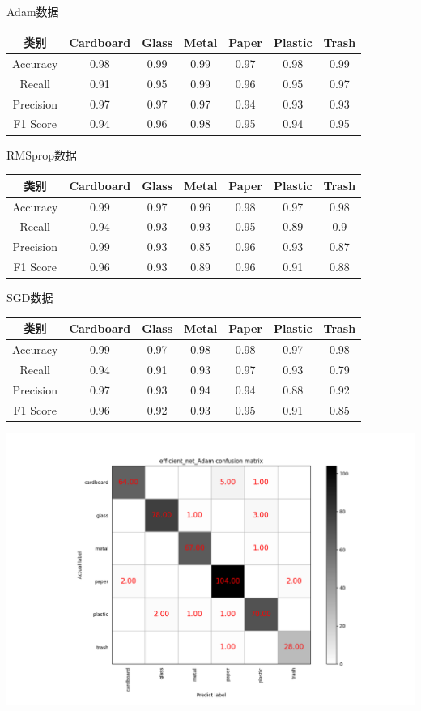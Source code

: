 \documentclass[UTF8]{ctexart}
\begin{document}
Adam数据

\begin{tabular}{|c|c|c|c|c|c|c|}
\hline 
类别 & Cardboard & Glass & Metal & Paper & Plastic & Trash \\ 
\hline 
Accuracy &0.98 &0.99& 0.99& 0.97& 0.98 &0.99\\
 \hline 
Recall &0.91& 0.95& 0.99& 0.96& 0.95 &0.97\\ 
\hline 
Precision &0.97& 0.97& 0.97& 0.94& 0.93 &0.93\\ 
\hline 
F1 Score &0.94& 0.96& 0.98& 0.95& 0.94& 0.95\\ 
\hline 
\end{tabular}

RMSprop数据

\begin{tabular}{|c|c|c|c|c|c|c|}
\hline 
类别 & Cardboard & Glass & Metal & Paper & Plastic & Trash \\ 
\hline 
Accuracy &0.99& 0.97& 0.96 &0.98 &0.97 &0.98\\
 \hline 
Recall &0.94 &0.93& 0.93& 0.95& 0.89 &0.9\\ 
\hline 
Precision &0.99 &0.93& 0.85& 0.96& 0.93 &0.87\\ 
\hline 
F1 Score &0.96 &0.93& 0.89& 0.96 &0.91& 0.88\\ 
\hline 
\end{tabular}

SGD数据

\begin{tabular}{|c|c|c|c|c|c|c|}
\hline 
类别 & Cardboard & Glass & Metal & Paper & Plastic & Trash \\ 
\hline 
Accuracy &0.99 &0.97& 0.98 &0.98& 0.97& 0.98\\
 \hline 
Recall &0.94& 0.91& 0.93 &0.97& 0.93 &0.79\\ 
\hline 
Precision &0.97& 0.93& 0.94& 0.94 &0.88& 0.92\\ 
\hline 
F1 Score &0.96& 0.92& 0.93& 0.95 &0.91& 0.85\\ 
\hline 
\end{tabular}

\includegraphics[scale=0.5]{cm/efficient_net_Adam.png} 
\end{document}
